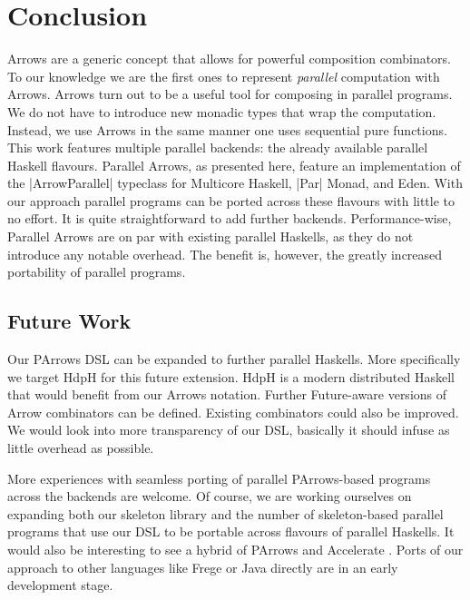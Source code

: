 
\section{Conclusion}
\label{sec:conclusion}
Arrows are a generic concept that allows for powerful composition
combinators. To our knowledge we are the first ones to represent
\emph{parallel} computation with Arrows.
%
Arrows turn out to be a useful tool for composing in parallel
programs. We do not have to introduce new monadic types that wrap the
computation. Instead, we use Arrows in the same manner one uses sequential pure functions. 
%
This work features multiple parallel backends: the already available parallel Haskell flavours. Parallel Arrows, as presented here, feature an implementation of the |ArrowParallel| typeclass for Multicore Haskell, |Par| Monad, and Eden. With our approach parallel programs can be ported across these flavours with little to no effort. It is quite straightforward to add further backends. 
%
%
Performance-wise, Parallel Arrows are on par with existing parallel Haskells, as they do not introduce any notable overhead.
%
The benefit is, however, the greatly increased portability of parallel
programs.



\subsection{Future Work}
\label{sec:future-work}

Our PArrows DSL can be expanded to further parallel Haskells. More specifically we target HdpH \cite{Maier:2014:HDS:2775050.2633363} for this future extension. HdpH is a modern distributed Haskell that would benefit from our Arrows notation. Further Future-aware versions of Arrow combinators can be defined. Existing combinators could also be improved. We would look into more transparency of our DSL,  basically it should infuse as little overhead as possible.

More experiences with seamless porting of parallel PArrows-based programs across the backends are welcome.
Of course, we are working ourselves on expanding both our skeleton library and the number of skeleton-based parallel programs that use our DSL to be portable across flavours of parallel Haskells.
It would also be interesting to see a hybrid of PArrows and Accelerate \cite{McDonell:2015:TRC:2887747.2804313}.
Ports of our approach to other languages like Frege or Java directly are in an early development stage.
